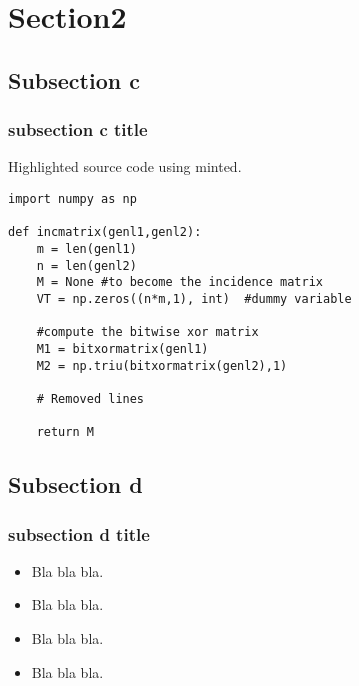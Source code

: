 \section{Section2}
%
\subsection{Subsection c}
\begin{frame}[label=sectionc, t, fragile]
\frametitle{subsection c title} 

Highlighted source code using minted.


\begin{verbatim}
import numpy as np

def incmatrix(genl1,genl2):
    m = len(genl1)
    n = len(genl2)
    M = None #to become the incidence matrix
    VT = np.zeros((n*m,1), int)  #dummy variable

    #compute the bitwise xor matrix
    M1 = bitxormatrix(genl1)
    M2 = np.triu(bitxormatrix(genl2),1)

    # Removed lines

    return M
\end{verbatim}

\end{frame}


%
\subsection{Subsection d}
\begin{frame}[label=sectiond]
\frametitle{subsection d title} 
\begin{itemize}
\item Bla bla bla.\\
\item Bla bla bla.\\
\item Bla bla bla.\\
\item Bla bla bla.\\
\end{itemize}
\end{frame}
